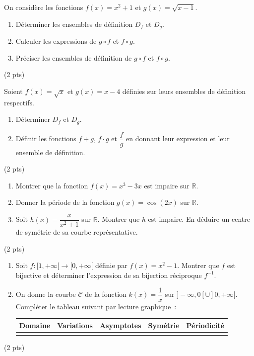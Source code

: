 \documentclass[11pt]{article}
\begin{document}
\begin{exercice}
On considère les fonctions $f(x) = x^2 + 1$ et $g(x) = \sqrt{x - 1}$.
\begin{enumerate}
    \item Déterminer les ensembles de définition $D_f$ et $D_g$.
    \item Calculer les expressions de $g \circ f$ et $f \circ g$.
    \item Préciser les ensembles de définition de $g \circ f$ et $f \circ g$.
\end{enumerate}
(2 pts)
\end{exercice}

\begin{exercice}
Soient $f(x) = \sqrt{x}$ et $g(x) = x - 4$ définies sur leurs ensembles de définition respectifs.
\begin{enumerate}
    \item Déterminer $D_f$ et $D_g$.
    \item Définir les fonctions $f+g$, $f \cdot g$ et $\dfrac{f}{g}$ en donnant leur expression et leur ensemble de définition.
\end{enumerate}
(2 pts)
\end{exercice}

\begin{exercice}
\begin{enumerate}
    \item Montrer que la fonction $f(x) = x^3 - 3x$ est impaire sur $\mathbb{R}$.
    \item Donner la période de la fonction $g(x) = \cos(2x)$ sur $\mathbb{R}$.
    \item Soit $h(x) = \dfrac{x}{x^2 + 1}$ sur $\mathbb{R}$. Montrer que $h$ est impaire. En déduire un centre de symétrie de sa courbe représentative.
\end{enumerate}
(2 pts)
\end{exercice}

\begin{exercice}
\begin{enumerate}
    \item Soit $f : [1, +\infty[ \to [0, +\infty[$ définie par $f(x) = x^2 - 1$. Montrer que $f$ est bijective et déterminer l'expression de sa bijection réciproque $f^{-1}$.
    \item On donne la courbe $\mathcal{C}$ de la fonction $k(x) = \dfrac{1}{x}$ sur $]-\infty, 0[ \cup ]0, +\infty[$. Compléter le tableau suivant par lecture graphique~:
    \begin{center}
    \begin{tabular}{|c|c|c|c|c|}
    \hline
    \textbf{Domaine} & \textbf{Variations} & \textbf{Asymptotes} & \textbf{Symétrie} & \textbf{Périodicité} \\
    \hline
    & & & & \\
    \hline
    \end{tabular}
    \end{center}
\end{enumerate}
(2 pts)
\end{exercice}
\end{document}
